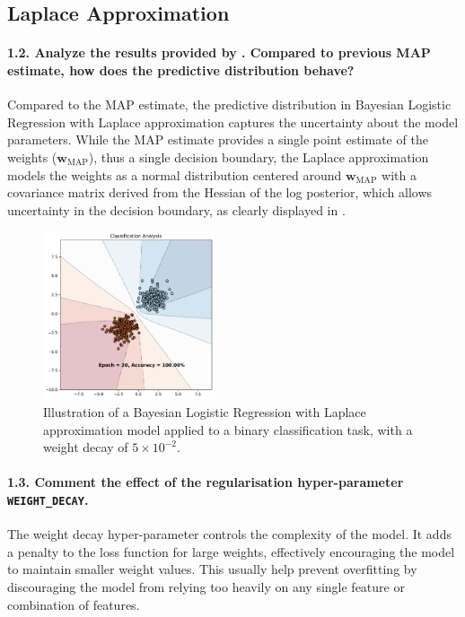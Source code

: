 \subsection{Laplace Approximation}
\paragraph{1.2. Analyze the results provided by . Compared to previous MAP estimate, how does the predictive distribution behave?}

Compared to the MAP estimate, the predictive distribution in Bayesian Logistic Regression with Laplace approximation captures the uncertainty about the model parameters. While the MAP estimate provides a single point estimate of the weights ($ \mathbf{w}_{\textrm{MAP}} $), thus a single decision boundary, the Laplace approximation models the weights as a normal distribution centered around $ \mathbf{w}_{\textrm{MAP}} $ with a covariance matrix derived from the Hessian of the log posterior, which allows uncertainty in the decision boundary, as clearly displayed in .

\begin{figure}[H]
    \centering
    \includegraphics[width=0.45\textwidth]{laplace_approx.pdf}
    \caption{Illustration of a Bayesian Logistic Regression with Laplace approximation model applied to a binary classification task, with a weight decay of $5 \times 10^{-2}$.}
    \label{fig:laplace_approx}
\end{figure}


\paragraph{1.3. Comment the effect of the regularisation hyper-parameter  \texttt{WEIGHT\_DECAY}.}

The weight decay hyper-parameter controls the complexity of the model. It adds a penalty to the loss function for large weights, effectively encouraging the model to maintain smaller weight values. This usually help prevent overfitting by discouraging the model from relying too heavily on any single feature or combination of features.

